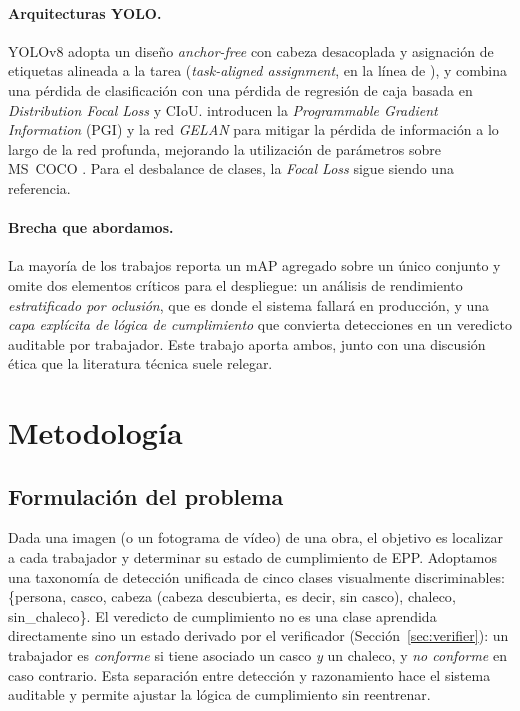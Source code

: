 \documentclass{article}
\begin{document}
\paragraph{Arquitecturas YOLO.} YOLOv8 \citep{jocher2023yolov8} adopta un
diseño \emph{anchor-free} con cabeza desacoplada y asignación de etiquetas
alineada a la tarea (\emph{task-aligned assignment}, en la línea de
\citealp{feng2021tood}), y combina una pérdida de clasificación con una pérdida
de regresión de caja basada en \emph{Distribution Focal Loss} y CIoU.
\citet{wang2024yolov9} introducen la \emph{Programmable Gradient Information}
(PGI) y la red \emph{GELAN} para mitigar la pérdida de información a lo largo
de la red profunda, mejorando la utilización de parámetros sobre MS~COCO
\citep{lin2014coco}. Para el desbalance de clases, la \emph{Focal Loss}
\citep{lin2017focal} sigue siendo una referencia.

\paragraph{Brecha que abordamos.} La mayoría de los trabajos reporta un mAP
agregado sobre un único conjunto y omite dos elementos críticos para el
despliegue: un análisis de rendimiento \emph{estratificado por oclusión}, que
es donde el sistema fallará en producción, y una \emph{capa explícita de lógica
de cumplimiento} que convierta detecciones en un veredicto auditable por
trabajador. Este trabajo aporta ambos, junto con una discusión ética que la
literatura técnica suele relegar.

\section{Metodología}

\subsection{Formulación del problema}
Dada una imagen (o un fotograma de vídeo) de una obra, el objetivo es localizar
a cada trabajador y determinar su estado de cumplimiento de EPP. Adoptamos una
taxonomía de detección unificada de cinco clases visualmente discriminables:
\{\textsf{persona}, \textsf{casco}, \textsf{cabeza} (cabeza descubierta, es
decir, sin casco), \textsf{chaleco}, \textsf{sin\_chaleco}\}. El veredicto de
cumplimiento no es una clase aprendida directamente sino un estado derivado por
el verificador (Sección~\ref{sec:verifier}): un trabajador es \emph{conforme}
si tiene asociado un casco \emph{y} un chaleco, y \emph{no conforme} en caso
contrario. Esta separación entre detección y razonamiento hace el sistema
auditable y permite ajustar la lógica de cumplimiento sin reentrenar.
\end{document}

